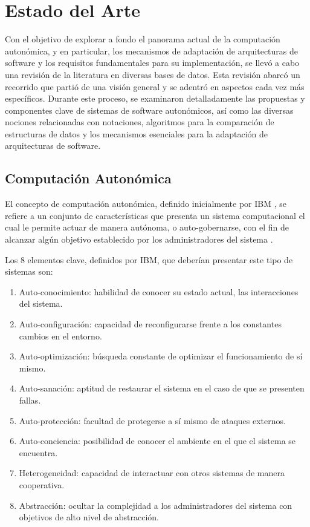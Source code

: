 \section{Estado del Arte}

Con el objetivo de explorar a fondo el panorama actual de la computación autonómica, y en particular, los mecanismos de adaptación de arquitecturas de software y los requisitos fundamentales para su implementación, se llevó a cabo una revisión de la literatura en diversas bases de datos. Esta revisión abarcó un recorrido que partió de una visión general y se adentró en aspectos cada vez más específicos. Durante este proceso, se examinaron detalladamente las propuestas y componentes clave de sistemas de software autonómicos, así como las diversas nociones relacionadas con notaciones, algoritmos para la comparación de estructuras de datos y los mecanismos esenciales para la adaptación de arquitecturas de software. 

\subsection{Computación Autonómica}


El concepto de computación autonómica, definido inicialmente por IBM \citeyear{horn_2001}, se refiere a un conjunto de características que presenta un sistema computacional el cual le permite actuar de manera autónoma, o auto-gobernarse, con el fin de alcanzar algún objetivo establecido por los administradores del sistema \cite{lalanda_diaconescu_mccann_2014}.


Los 8 elementos clave, definidos por IBM, que deberían presentar este tipo de sistemas son:
\begin{enumerate}
    \item Auto-conocimiento: habilidad de conocer su estado actual, las interacciones del sistema.
    \item Auto-configuración: capacidad de reconfigurarse frente a los constantes cambios en el entorno.
    \item Auto-optimización: búsqueda constante de optimizar el funcionamiento de sí mismo.
    \item Auto-sanación: aptitud de restaurar el sistema en el caso de que se presenten fallas.
    \item Auto-protección: facultad de protegerse a sí mismo de ataques externos.
    \item Auto-conciencia: posibilidad de conocer el ambiente en el que el sistema se encuentra.
    \item Heterogeneidad: capacidad de interactuar con otros sistemas de manera cooperativa.
    \item Abstracción: ocultar la complejidad a los administradores del sistema con objetivos de alto nivel de abstracción.
\end{enumerate}

